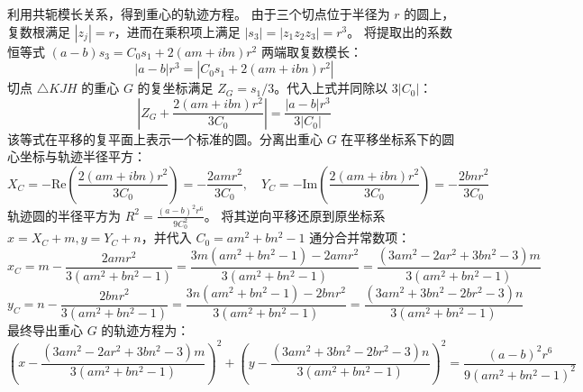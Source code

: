\begin{solution}
利用共轭模长关系，得到重心的轨迹方程。
由于三个切点位于半径为 $r$ 的圆上，复数根满足 $|z_j| = r$，进而在乘积项上满足 $|s_3| = |z_1 z_2 z_3| = r^3$。
将提取出的系数恒等式 $(a-b)s_3 = C_0 s_1 + 2(am+ibn)r^2$ 两端取复数模长：
\[ |a-b| r^3 = |C_0 s_1 + 2(am+ibn)r^2| \]
切点 $\triangle KJH$ 的重心 $G$ 的复坐标满足 $Z_G = s_1 / 3$。代入上式并同除以 $3|C_0|$：
\[ \left| Z_G + \frac{2(am+ibn)r^2}{3C_0} \right| = \frac{|a-b| r^3}{3|C_0|} \]
该等式在平移的复平面上表示一个标准的圆。分离出重心 $G$ 在平移坐标系下的圆心坐标与轨迹半径平方：
\[ X_C = -\text{Re}\left(\frac{2(am+ibn) r^2}{3C_0}\right) = -\frac{2am r^2}{3C_0}, \quad Y_C = -\text{Im}\left(\frac{2(am+ibn) r^2}{3C_0}\right) = -\frac{2bn r^2}{3C_0} \]
轨迹圆的半径平方为 $R^2 = \frac{(a-b)^2 r^6}{9C_0^2}$。
将其逆向平移还原到原坐标系 $x = X_C + m, y = Y_C + n$，并代入 $C_0 = am^2+bn^2-1$ 通分合并常数项：
\[ x_C = m - \frac{2am r^2}{3(am^2+bn^2-1)} = \frac{3m(am^2+bn^2-1) - 2am r^2}{3(am^2+bn^2-1)} = \frac{(3am^2 - 2ar^2 + 3bn^2 - 3)m}{3(am^2+bn^2-1)} \]
\[ y_C = n - \frac{2bn r^2}{3(am^2+bn^2-1)} = \frac{3n(am^2+bn^2-1) - 2bn r^2}{3(am^2+bn^2-1)} = \frac{(3am^2 + 3bn^2 - 2br^2 - 3)n}{3(am^2+bn^2-1)} \]
最终导出重心 $G$ 的轨迹方程为：
\[ \left( x - \frac{(3am^2 - 2ar^2 + 3bn^2 - 3)m}{3(am^2 + bn^2 - 1)} \right)^2 + \left( y - \frac{(3am^2 + 3bn^2 - 2br^2 - 3)n}{3(am^2 + bn^2 - 1)} \right)^2 = \frac{(a - b)^2 r^6}{9(am^2 + bn^2 - 1)^2} \]
\end{solution}





